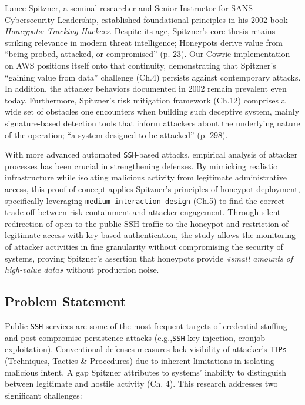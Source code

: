 \documentclass{cls/ULBreport}
\begin{document}
    Lance Spitzner, a seminal researcher and Senior Instructor for SANS Cybersecurity Leadership, established foundational principles in his 2002 book \textit{Honeypots: Tracking Hackers}. 
    Despite its age, Spitzner's core thesis retains striking relevance in modern threat intelligence; Honeypots derive value from \enquote{being probed, attacked, or compromised} (p. 23). Our Cowrie implementation on AWS positions itself onto that continuity, demonstrating that Spitzner's \enquote{gaining value from data} challenge (Ch.4) persists against contemporary attacks. In addition, the attacker behaviors documented in 2002 remain prevalent even today. Furthermore, Spitzner's risk mitigation framework (Ch.12) comprises a wide set of obstacles one encounters when building such deceptive system, mainly signature-based detection tools that inform attackers about the underlying nature of the operation; \enquote{a system designed to be attacked} (p. 298). 
    
    
    With more advanced automated \texttt{SSH}-based attacks, empirical analysis of attacker processes has been crucial in strengthening defenses. By mimicking realistic infrastructure while isolating malicious activity from legitimate administrative access, this proof of concept applies Spitzner's principles of honeypot deployment, specifically leveraging \texttt{medium-interaction design} (Ch.5) to find the correct trade-off between risk containment and attacker engagement. Through silent redirection of open-to-the-public SSH traffic to the honeypot and restriction of legitimate access with key-based authentication, the study allows the monitoring of attacker activities in fine granularity without compromising the security of systems, proving Spitzner's assertion that honeypots provide \textit{«small amounts of high-value data»} without production noise.  

        \subsection{Problem Statement} 
        Public \texttt{SSH} services are some of the most frequent targets of credential stuffing and post-compromise persistence attacks (e.g.,\texttt{SSH} key injection, cronjob exploitation). Conventional defenses measures lack visibility of attacker's \texttt{TTPs} (Techniques, Tactics \& Procedures) due to inherent limitations in isolating malicious intent. A gap Spitzner attributes to systems' inability to distinguish between legitimate and hostile activity (Ch. 4). This research addresses two significant challenges: 
            
\end{document}
